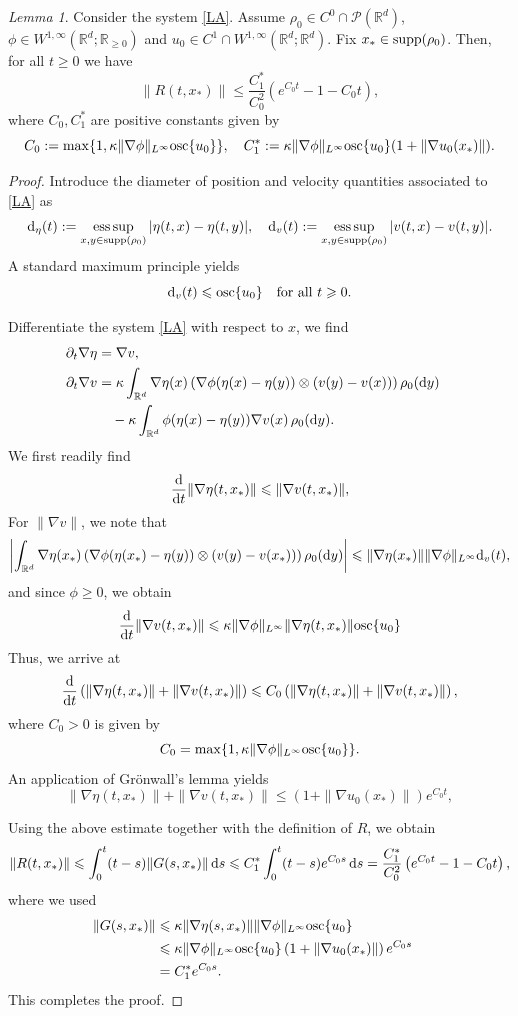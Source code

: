 \documentclass[11pt]{amsart}
\numberwithin{equation}{section}
\newtheorem{lemma}[theorem]{Lemma}
\theoremstyle{definition}
\theoremstyle{remark}
\numberwithin{equation}{section}
\newtheorem{lemma}[theorem]{Lemma}
\newcommand{\R}{\mathbb R}
\newcommand{\bq}{\begin{equation}}
\newcommand{\eq}{\end{equation}}
\newcommand{\lt}{\left}
\newcommand{\rt}{\right}
\newcommand{\pa}{\partial}
\newcommand{\intr}{\int_{\R^d}}
\newcommand{\calP}{\mathcal P}
\newcommand{\rd}{\textnormal{d}}
\newcommand{\dt}{\textnormal{d}t}
\newcommand{\dy}{\textnormal{d}y}
\newcommand{\ds}{\textnormal{d}s}
\newcommand{\supp}{{\rm supp}}
\newcommand{\rdv}{\textnormal{osc}\{u_0\}}
\renewcommand{\geq}{\geqslant}
\renewcommand{\ge}{\geqslant}
\renewcommand{\leq}{\leqslant}
\renewcommand{\le}{\leqslant}
\DeclareMathOperator*{\esssup}{ess\,sup}
\begin{document}
 
\begin{lemma}\label{lem:gro} Consider the system \eqref{LA}. Assume $\rho_0\in C^0\cap\calP(\R^d)$, $\phi \in W^{1,\infty}(\R^d; \R_{\ge 0})$ and $u_0\in C^1\cap W^{1,\infty}(\R^d;\R^d)$. Fix $x_* \in \supp (\rho_0)$. Then, for all $t \geq 0$ we have
\[%
\|R(t,x_*)\| \leq \frac{C_1^*}{C_0^2} \lt( e^{C_0 t} - 1 - C_0 t\rt),
\]%
where $C_0, C_1^*$ are positive constants given by
\[
C_0 := \max\{1, \kappa\|\nabla \phi\|_{L^\infty} \rdv \}, \quad C_1^* := \kappa\|\nabla\phi\|_{L^\infty} \rdv (1 + \|\nabla u_0(x_*)\|).
\]
\end{lemma}
\begin{proof}
 Introduce the diameter of position and velocity quantities associated to \eqref{LA} as
 \[
 \rd_\eta(t): = \esssup_{x,y \in \supp(\rho_0)}|\eta(t,x) - \eta(t,y)|, \quad  \rd_v(t): = \esssup_{x,y \in \supp(\rho_0)}|v(t,x) - v(t,y)|.
 \]
A standard maximum principle yields
 \[
 \rd_v(t) \leq \rdv \quad \text{for all } t \geq 0.
 \]
 
Differentiate the system \eqref{LA} with respect to $x$, we find
\begin{align*}
\pa_t \nabla \eta &= \nabla v, \cr
\pa_t \nabla v &= \kappa \intr \nabla \eta(x)  \lt(\nabla\phi(\eta(x) - \eta(y))\otimes(v(y) - v(x))\rt) \rho_0(\dy) \cr
&\quad  - \kappa \intr \phi(\eta(x) - \eta(y))   \nabla v(x)\,\rho_0(\dy).
\end{align*}
We first readily find
\[
\frac{\rd}{\dt} \|\nabla \eta(t,x_*)\| \leq \|\nabla v(t,x_*)\|,
\]
For $\|\nabla v\|$, we note that 
\[
\lt|\intr \nabla \eta(x_*)  \lt(\nabla\phi(\eta(x_*) - \eta(y))\otimes(v(y) - v(x_*))\rt) \rho_0(\dy)\rt| \leq \|\nabla \eta(x_*)\|\|\nabla\phi\|_{L^\infty} \rd_v(t),
\] 
and since $\phi \geq 0$, we obtain
\[
\frac{\rd}{\dt}\|\nabla v(t,x_*) \|  \leq \kappa \|\nabla\phi\|_{L^\infty}\|\nabla \eta(t,x_*) \|  \rdv  
\] 
Thus, we arrive at
\[
\frac{\rd}{\dt} \lt( \|\nabla \eta(t,x_*)\| + \|\nabla v(t,x_*)\| \rt) \leq C_0 \lt( \|\nabla \eta(t,x_*)\| + \|\nabla v(t,x_*)\|\rt),
\]
where $C_0 > 0$ is given by
\[
C_0 = \max\{1, \kappa\|\nabla \phi\|_{L^\infty} \rdv \}.
\]
An application of Gr\"onwall's lemma yields
\[
\|\nabla \eta(t,x_*) \| + \|\nabla v(t,x_*)\| \leq \lt( 1 + \|\nabla u_0(x_*)\| \rt ) e^{C_0 t},
\]

Using the above estimate together with the definition of $R$, we obtain
\[
\|R(t,x_*)\| \le \int_0^t (t-s)\|G(s,x_*)\|\,\ds \le C_1^* \int_0^t (t-s) e^{C_0 s}\,\ds = \frac{C_1^*}{C_0^2} \lt(e^{C_0 t} - 1 - C_0 t\rt),
\]
where we used
\begin{align*}
\|G(s,x_*)\| &\leq \kappa \|\nabla \eta(s,x_*)\| \|\nabla\phi\|_{L^\infty} \rdv \cr
&\leq \kappa\|\nabla\phi\|_{L^\infty} \rdv\lt(1 + \|\nabla u_0(x_*)\|\rt) e^{C_0 s} \cr
&= C_1^* e^{C_0 s}.
\end{align*}
This completes the proof.
\end{proof}
 
\end{document}
